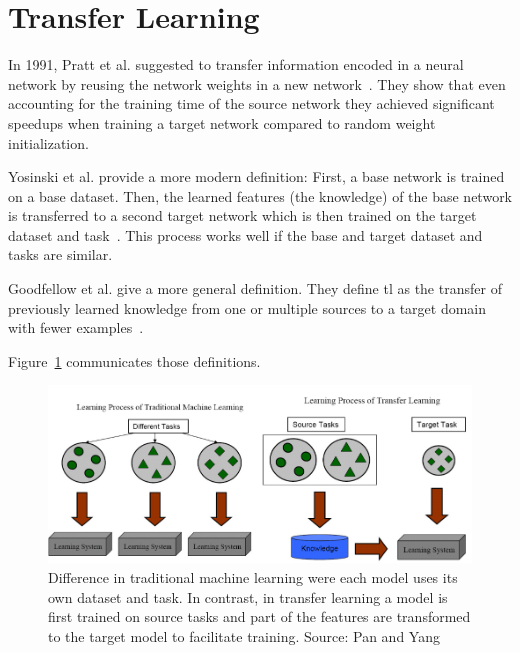 \section{Transfer Learning}
\label{sec:TransferLearning}

In 1991, Pratt et al. suggested to transfer information encoded in a neural network by reusing the network weights in a new network~\cite{Pratt1991}. They show that even accounting for the training time of the source network they achieved significant speedups when training a target network compared to random weight initialization.

Yosinski et al. provide a more modern definition: First, a base network is trained on a base dataset. Then, the learned features {(the knowledge)} of the base network is transferred to a second target network which is then trained on the target dataset and task~\cite{Yosinski2014}. This process works well if the base and target dataset and tasks are similar.

Goodfellow et al. give a more general definition. They define \gls{tl} as the transfer of previously learned knowledge from one or multiple sources to a target domain with fewer examples~\cite{Goodfellow2016}.

Figure~\ref{fig:03_transferLearning} communicates those definitions. 
\begin{figure}[ht]
	\centering
	\includegraphics[scale=0.55]{figures/03_theory/03_transferLearning}
	\caption{Difference in traditional machine learning were each model uses its own dataset and task. In contrast, in transfer learning a model is first trained on source tasks and part of the features are transformed to the target model to facilitate training. Source: Pan and Yang~\cite{Pan2010}}
	\label{fig:03_transferLearning}
\end{figure}

